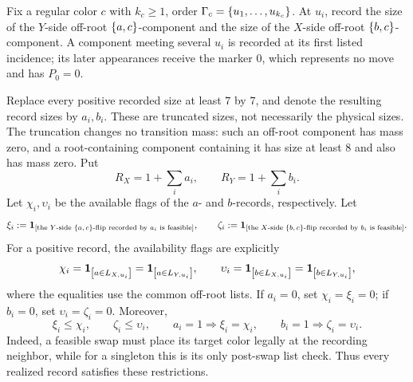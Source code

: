 \begin{definition}\label{def:cv-component-records}
Fix a regular color $c$ with $k_c\ge1$, order
$\Gamma_c=\left\{u_1,\ldots,u_{k_c}\right\}$.  At $u_i$, record the size
of the $Y$-side off-root $\left\{a,c\right\}$-component and the size of the
$X$-side off-root $\left\{b,c\right\}$-component.  A component meeting several
$u_i$ is recorded at its first listed incidence; its later appearances receive
the marker $0$, which represents no move and has $P_0=0$.

Replace every positive recorded size at least $7$ by $7$, and denote the
resulting record sizes by $a_i,b_i$.  These are truncated sizes, not
necessarily the physical sizes.  The truncation changes no transition mass:
such an off-root component has mass zero, and a root-containing component
containing it has size at least $8$ and also has mass zero.  Put
\[
  R_X=1+\sum_i a_i,\qquad R_Y=1+\sum_i b_i.
\]
 Let $\chi_i,\upsilon_i$ be the available flags of the \(a\)- and
\(b\)-records, respectively.  Let
\[
 \xi_i:=\mathbf{1}_{\left[\text{the \(Y\)-side \(\{a,c\}\)-flip recorded by \(a_i\)
                         is feasible}\right]},\qquad
 \zeta_i:=\mathbf{1}_{\left[\text{the \(X\)-side \(\{b,c\}\)-flip recorded by \(b_i\)
                         is feasible}\right]} .
\]
For a positive record, the availability flags are explicitly
\[
  \chi_i=\mathbf{1}_{\left[a\in L_{X,u_i}\right]}=\mathbf{1}_{\left[a\in L_{Y,u_i}\right]},
  \qquad
  \upsilon_i=\mathbf{1}_{\left[b\in L_{X,u_i}\right]}=\mathbf{1}_{\left[b\in L_{Y,u_i}\right]},
\]
where the equalities use the common off-root lists.  If \(a_i=0\), set
\(\chi_i=\xi_i=0\); if \(b_i=0\), set
\(\upsilon_i=\zeta_i=0\).  Moreover,
\[
  \xi_i\le\chi_i,\qquad \zeta_i\le\upsilon_i,\qquad
  a_i=1\Longrightarrow\xi_i=\chi_i,\qquad
  b_i=1\Longrightarrow\zeta_i=\upsilon_i.
\]
Indeed, a feasible swap must place its target color legally at the
recording neighbor, while for a singleton this is its only post-swap list
check.  Thus every realized record satisfies these restrictions.


\end{definition}
